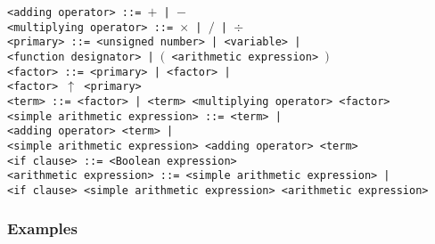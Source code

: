 \documentclass[a4paper,11pt]{article}
\begin{document}
\begin{flushleft}
\vspace{0.2em}\texttt{<adding operator> ::= $+$ | $-$}\\

\vspace{0.2em}\texttt{<multiplying operator> ::= $\times$ | $/$ | $\div$}\\

\vspace{0.2em}\texttt{<primary> ::= <unsigned number> | <variable> |\\
  \hspace{1.0cm}<function designator> | $($ <arithmetic expression> $)$}\\

\vspace{0.2em}\texttt{<factor> ::= <primary> | <factor> |\\
  \hspace{1.0cm}<factor> $\uparrow$ <primary>}\\

\vspace{0.2em}\texttt{<term> ::= <factor> | <term> <multiplying operator> <factor>}\\

\vspace{0.2em}\texttt{<simple arithmetic expression> ::= <term> |\\
  \hspace{1.0cm}<adding operator> <term> |\\
  \hspace{1.0cm}<simple arithmetic expression> <adding operator> <term>}\\

\vspace{0.2em}\texttt{<if clause> ::=  <Boolean expression> }\\

\vspace{0.2em}\texttt{<arithmetic expression> ::= <simple arithmetic expression> |\\
  \hspace{1.0cm}<if clause> <simple arithmetic expression>  <arithmetic expression>}\\

\end{flushleft}


\subsubsection{Examples}
\end{document}
